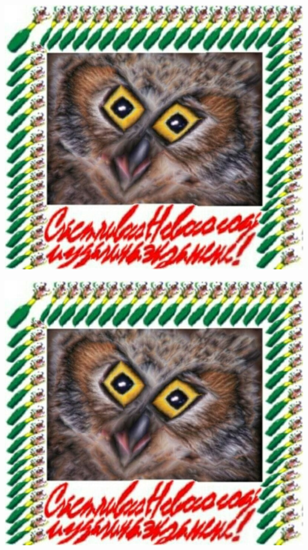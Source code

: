 \documentclass[../main.tex]{subfiles}
\begin{document}
\includegraphics[scale=0.5]{example.jpg}

\includegraphics[scale=0.5]{example.jpg}
\end{document}
